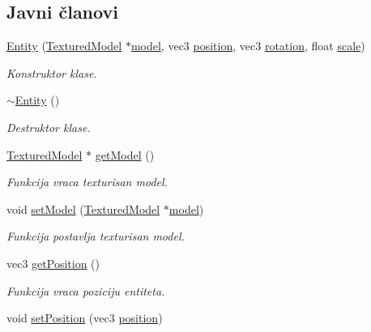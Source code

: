 \subsection*{Javni članovi}
\begin{DoxyCompactItemize}
\item 
\hyperlink{classentity_1_1Entity_a1668042c968a630c82bbbcec8520400e}{Entity} (\hyperlink{classmodel_1_1TexturedModel}{Textured\+Model} $\ast$\hyperlink{classentity_1_1Entity_ac7848c5d47d4b2bf12c84ddbbc32052a}{model}, vec3 \hyperlink{classentity_1_1Entity_ad409c7f2085024479b276c2b6948bddb}{position}, vec3 \hyperlink{classentity_1_1Entity_aedb4c5dc1cfbc8cb3f6deb565ea920cb}{rotation}, float \hyperlink{classentity_1_1Entity_a59e5d5e3575df70cd5c74b5d739d84ca}{scale})
\begin{DoxyCompactList}\small\item\em Konstruktor klase. \end{DoxyCompactList}\item 
\hyperlink{classentity_1_1Entity_a2d1aa154095b15e2dd6fa484ec00867e}{$\sim$\+Entity} ()
\begin{DoxyCompactList}\small\item\em Destruktor klase. \end{DoxyCompactList}\item 
\hyperlink{classmodel_1_1TexturedModel}{Textured\+Model} $\ast$ \hyperlink{classentity_1_1Entity_abc6481a8bab918cfb1309d3d342ccad1}{get\+Model} ()
\begin{DoxyCompactList}\small\item\em Funkcija vraca texturisan model. \end{DoxyCompactList}\item 
void \hyperlink{classentity_1_1Entity_a68bdcd0dcae978514e87ee53c60367e2}{set\+Model} (\hyperlink{classmodel_1_1TexturedModel}{Textured\+Model} $\ast$\hyperlink{classentity_1_1Entity_ac7848c5d47d4b2bf12c84ddbbc32052a}{model})
\begin{DoxyCompactList}\small\item\em Funkcija postavlja texturisan model. \end{DoxyCompactList}\item 
vec3 \hyperlink{classentity_1_1Entity_ad255abb1afcceceb6f2efea66086d8bd}{get\+Position} ()
\begin{DoxyCompactList}\small\item\em Funkcija vraca poziciju entiteta. \end{DoxyCompactList}\item 
void \hyperlink{classentity_1_1Entity_abb5f477d3eac07d19f0545df10e3077c}{set\+Position} (vec3 \hyperlink{classentity_1_1Entity_ad409c7f2085024479b276c2b6948bddb}{position})

\end{DoxyCompactItemize}
